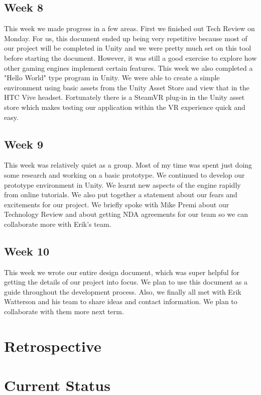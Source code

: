 \documentclass[10pt,journal,compsoc,onecolumn, draftclsnofoot]{IEEEtran}
\begin{document}
\subsection{Week 8}
This week we made progress in a few areas. First we finished out Tech Review on Monday.
For us, this document ended up being very repetitive because most of our project will be completed in Unity and we were pretty much set on this tool before starting the document.
However, it was still a good exercise to explore how other gaming engines implement certain features.
This week we also completed a "Hello World" type program in Unity.
We were able to create a simple environment using basic assets from the Unity Asset Store and view that in the HTC Vive headset.
Fortunately there is a SteamVR plug-in in the Unity asset store which makes testing our application within the VR experience quick and easy.

\subsection{Week 9}
This week was relatively quiet as a group.
Most of my time was spent just doing some research and working on a basic prototype.
We continued to develop our prototype environment in Unity.
We learnt new aspects of the engine rapidly from online tutorials.
We also put together a statement about our fears and excitements for our project.
We briefly spoke with Mike Premi about our Technology Review and about getting NDA agreements for our team so we can collaborate more with Erik's team.

\subsection{Week 10}
This week we wrote our entire design document, which was super helpful for getting the details of our project into focus.
We plan to use this document as a guide throughout the development process.
Also, we finally all met with Erik Watterson and his team to share ideas and contact information.
We plan to collaborate with them more next term.

\section{Retrospective}


\section{Current Status}







%
%
\end{document}
